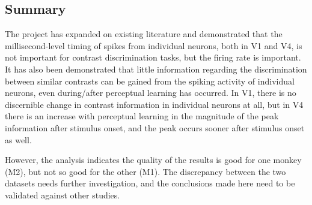 \subsection{Summary}

The project has expanded on existing literature and demonstrated that the millisecond-level timing of spikes from individual neurons, both in \ac{V1} and \ac{V4}, is not important for contrast discrimination tasks, but the firing rate is important.
It has also been demonstrated that little information regarding the discrimination between similar contrasts can be gained from the spiking activity of individual neurons, even during/after perceptual learning has occurred.
In \ac{V1}, there is no discernible change in contrast information in individual neurons at all, but in \ac{V4} there is an increase with perceptual learning in the magnitude of the peak information after stimulus onset, and the peak occurs sooner after stimulus onset as well.

However, the analysis indicates the quality of the results is good for one monkey (\ac{M2}), but not so good for the other (\ac{M1}).
The discrepancy between the two datasets needs further investigation, and the conclusions made here need to be validated against other studies.
